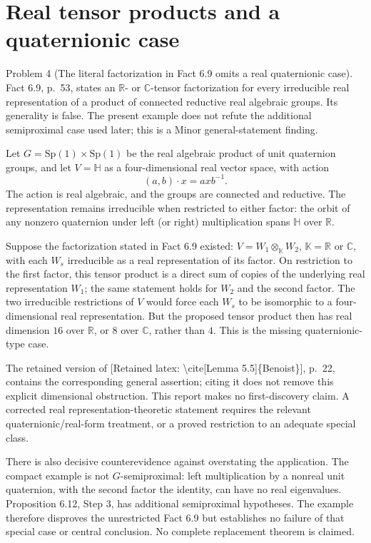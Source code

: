 \documentclass[10pt]{article}
\begin{document}
\section*{Real tensor products and a quaternionic case}
Problem 4 (The literal factorization in Fact 6.9 omits a real quaternionic case).  Fact 6.9, p. 53, states an \(\mathbb R\)- or \(\mathbb C\)-tensor factorization for every irreducible real representation of a product of connected reductive real algebraic groups. Its generality is false. The present example does not refute the additional semiproximal case used later; this is a Minor general-statement finding.\par
Let \(G=\mathrm{Sp}(1)\times\mathrm{Sp}(1)\) be the real algebraic product of unit quaternion groups, and let \(V=\mathbb H\) as a four-dimensional real vector space, with action \[(a,b)\cdot x=axb^{-1}.\] The action is real algebraic, and the groups are connected and reductive. The representation remains irreducible when restricted to either factor: the orbit of any nonzero quaternion under left (or right) multiplication spans \(\mathbb H\) over \(\mathbb R\).\par
Suppose the factorization stated in Fact 6.9 existed: \(V=W_1\otimes_{\mathbb K}W_2\), \(\mathbb K=\mathbb R\) or \(\mathbb C\), with each \(W_s\) irreducible as a real representation of its factor. On restriction to the first factor, this tensor product is a direct sum of copies of the underlying real representation \(W_1\); the same statement holds for \(W_2\) and the second factor. The two irreducible restrictions of \(V\) would force each \(W_s\) to be isomorphic to a four-dimensional real representation. But the proposed tensor product then has real dimension \(16\) over \(\mathbb R\), or \(8\) over \(\mathbb C\), rather than \(4\). This is the missing quaternionic-type case.\par
The retained version of [Retained latex: \textbackslash{}cite[Lemma 5.5]\{Benoist\}], p. 22, contains the corresponding general assertion; citing it does not remove this explicit dimensional obstruction. This report makes no first-discovery claim. A corrected real representation-theoretic statement requires the relevant quaternionic/real-form treatment, or a proved restriction to an adequate special class.\par
There is also decisive counterevidence against overstating the application. The compact example is not \(G\)-semiproximal: left multiplication by a nonreal unit quaternion, with the second factor the identity, can have no real eigenvalues. Proposition 6.12, Step 3, has additional semiproximal hypotheses. The example therefore disproves the unrestricted Fact 6.9 but establishes no failure of that special case or central conclusion. No complete replacement theorem is claimed.\par
\end{document}

